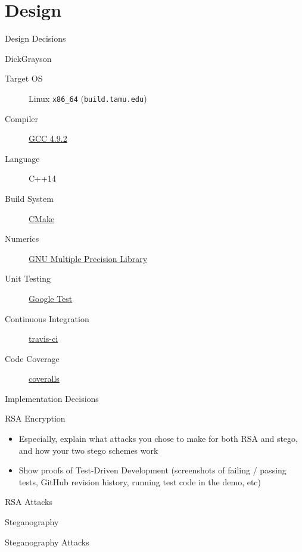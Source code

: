 \documentclass[presentation]{beamer}
\begin{document}
\section{Design}
\label{sec-2}
\begin{frame}[fragile,label=sec-2-1]{Design Decisions}
 \begin{block}{DickGrayson}
\begin{description}
\item[{Target OS}] Linux \texttt{x86\_64} (\texttt{build.tamu.edu})
\item[{Compiler}] \href{https://gcc.gnu.org/}{GCC 4.9.2}
\item[{Language}] C++14
\item[{Build System}] \href{https://cmake.org}{CMake}
\item[{Numerics}] \href{https://gmplib.org}{GNU Multiple Precision Library}
\item[{Unit Testing}] \href{https://code.google.com/p/googletest/}{Google Test}
\item[{Continuous Integration}] \href{http://travis-ci.org}{travis-ci}
\item[{Code Coverage}] \href{http://coveralls.io}{coveralls}
\end{description}
\end{block}
\end{frame}
\begin{frame}[label=sec-2-2]{Implementation Decisions}
\begin{block}{RSA Encryption}
\begin{itemize}
\item Especially, explain what attacks you chose to make for both RSA and stego, and
how your two stego schemes work
\item Show proofs of Test-Driven Development (screenshots of failing / passing
tests, GitHub revision history, running test code in the demo, etc)
\end{itemize}
\end{block}
\begin{block}{RSA Attacks}
\end{block}
\begin{block}{Steganography}
\end{block}
\begin{block}{Steganography Attacks}
\end{block}
\end{frame}
\end{document}

